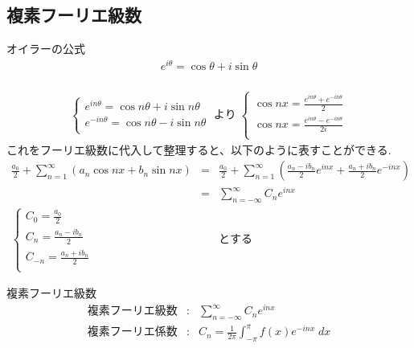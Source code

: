 \documentclass[a4paper]{jsarticle}
\begin{document}
\subsection{複素フーリエ級数}
\begin{itembox}[l]{オイラーの公式}
    \begin{eqnarray*}
        e^{i\theta} = \cos \theta + i \sin \theta\\
    \end{eqnarray*}
\end{itembox}
\begin{eqnarray*}
    \begin{cases}
        e^{in\theta} = \cos n\theta + i \sin n\theta  \\
        e^{-in\theta} = \cos n\theta - i \sin n\theta \\
    \end{cases}
    \; より \;
    \begin{cases}
        \displaystyle\cos nx = \frac{ e^{in\theta} +  e^{-in\theta}}{2}  \\
        \displaystyle\cos nx = \frac{ e^{in\theta} -  e^{-in\theta}}{2i} \\
    \end{cases}
\end{eqnarray*}
これをフーリエ級数に代入して整理すると、以下のように表すことができる.
\begin{eqnarray*}
    \frac{a_0}{2} + \sum^\infty_{n=1}\left(a_n \cos nx+b_n \sin nx\right)
    &=&\frac{a_0}{2} + \sum^\infty_{n=1}\left(\frac{a_n-ib_n}{2}e^{inx}+\frac{a_n+ib_n}{2}e^{-inx}\right)\\
    &=&\sum^\infty_{n=-\infty} C_n e^{inx}\\
    \begin{cases}
        \displaystyle C_0 = \frac{a_0}{2}         \\
        \displaystyle C_n = \frac{a_n-ib_n}{2}    \\
        \displaystyle C_{-n} = \frac{a_n+ib_n}{2} \\
    \end{cases}
    &&とする
\end{eqnarray*}
\begin{itembox}[l]{複素フーリエ級数}
    \begin{eqnarray*}
        複素フーリエ級数 &:& \sum^\infty_{n=-\infty} C_n e^{inx} \\
        複素フーリエ係数 &:& C_n = \frac{1}{2\pi} \int^{\pi}_{-\pi} f\left(x\right) e^{-inx} \;dx\\
    \end{eqnarray*}
\end{itembox}
\end{document}
